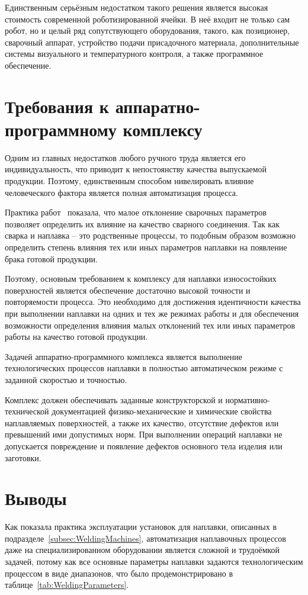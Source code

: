 Единственным серьёзным недостатком такого решения является высокая стоимость современной роботизированной ячейки.
В неё входит не только сам робот, но и целый ряд сопутствующего оборудования, такого, как позиционер, сварочный аппарат, устройство подачи присадочного материала, дополнительные системы визуального и температурного контроля, а также программное обеспечение.


\section{Требования к аппаратно-программному комплексу}
Одним из главных недостатков любого ручного труда является его индивидуальность, что приводит к непостоянству качества выпускаемой продукции.
Поэтому, единственным способом нивелировать влияние человеческого фактора является полная автоматизация процесса.

Практика работ~\cite{Al_Sarraf_2016, Dai_2011, Gwan_Hyung_Kim, Liang_2011, Lin_2018, Xu_2008} показала, что малое отклонение сварочных параметров позволяет определить их влияние на качество сварного соединения.
Так как сварка и наплавка -- это родственные процессы, то подобным образом возможно определить степень влияния тех или иных параметров наплавки на появление брака готовой продукции.

Поэтому, основным требованием к комплексу для наплавки износостойких поверхностей является обеспечение достаточно высокой точности и повторяемости процесса.
Это необходимо для достижения идентичности качества при выполнении наплавки на одних и тех же режимах работы и для обеспечения возможности определения влияния малых отклонений тех или иных параметров работы на качество готовой продукции.

Задачей аппаратно-программного комплекса является выполнение технологических процессов наплавки в полностью автоматическом режиме с заданной скоростью и точностью.

Комплекс должен обеспечивать заданные конструкторской и нормативно-технической документацией физико-механические и химические свойства наплавляемых поверхностей, а также их качество, отсутствие дефектов или превышений ими допустимых норм.
При выполнении операций наплавки не допускается повреждение и появление дефектов основного тела
изделия или заготовки.


\section{Выводы}
Как показала практика эксплуатации установок для наплавки, описанных в подразделе~\ref{subsec:WeldingMachines}, автоматизация наплавочных процессов даже на специализированном оборудовании является сложной и трудоёмкой задачей, потому как все основные параметры наплавки задаются технологическим процессом в виде диапазонов, что было продемонстрировано в таблице~\ref{tab:WeldingParameters}.

